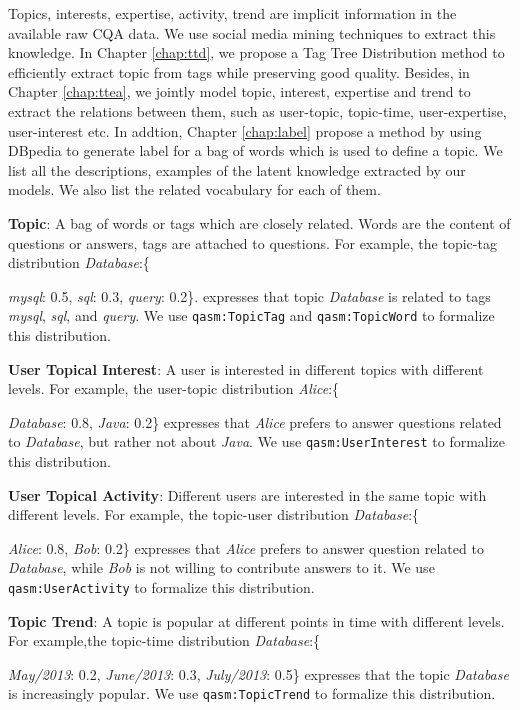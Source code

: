 Topics, interests, expertise, activity, trend are implicit information in the available raw CQA data. We use social media mining techniques to extract this knowledge.
In Chapter \ref{chap:ttd}, we propose a Tag Tree Distribution method to efficiently extract topic from tags while preserving good quality. Besides, in Chapter \ref{chap:ttea}, we jointly model topic, interest, expertise and trend to extract the relations between them, such as user-topic, topic-time, user-expertise, user-interest etc. In addtion, Chapter \ref{chap:label} propose a method by using DBpedia to generate label for a bag of words which is used to define a topic. 
We list all the descriptions, examples of the latent knowledge extracted by our models. We also list the related vocabulary for each of them.


\textbf{Topic}: A bag of words or tags which are closely related. Words are the content of questions or answers, tags are attached to questions. For example, the topic-tag distribution \textit{Database}:\{{\textit{mysql}: 0.5, \textit{sql}: 0.3, \textit{query}: 0.2\}. expresses that topic \textit{Database} is related to tags \textit{mysql}, \textit{sql}, and \textit{query}. We use \texttt{qasm:TopicTag} and \texttt{qasm:TopicWord} to formalize this distribution.

\textbf{User Topical Interest}: A user is interested in different topics with different levels. For example, the user-topic distribution \textit{Alice}:\{{\textit{Database}: 0.8, \textit{Java}: 0.2\} expresses that \textit{Alice} prefers to answer questions related to \textit{Database}, but rather not about \textit{Java}. We use \texttt{qasm:UserInterest} to formalize this distribution.

\textbf{User Topical Activity}:  Different users are interested in the same topic with different levels. For example, the topic-user distribution \textit{Database}:\{{\textit{Alice}: 0.8, \textit{Bob}: 0.2\} expresses that \textit{Alice} prefers to answer question related to \textit{Database}, while \textit{Bob} is not willing to contribute answers to it. We use \texttt{qasm:UserActivity} to formalize this distribution.

\textbf{Topic Trend}: A topic is popular at different points in time with different levels. For example,the topic-time distribution \textit{Database}:\{{\textit{May/2013}: 0.2, \textit{June/2013}: 0.3, \textit{July/2013}: 0.5\} expresses that the topic \textit{Database} is increasingly popular.%
We use \texttt{qasm:TopicTrend} to formalize this distribution.


}}}}
